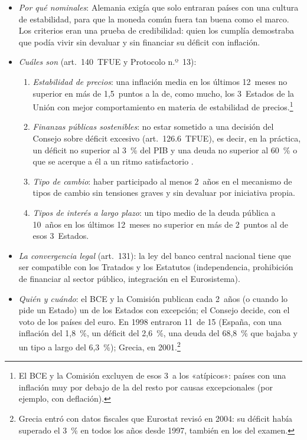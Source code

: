 \documentclass[11pt]{article}
\begin{document}
\begin{itemize}
\item \emph{Por qué nominales}: Alemania exigía que solo entraran países con una cultura de estabilidad, para que la moneda común fuera tan buena como el marco. Los criterios eran una prueba de credibilidad: quien los cumplía demostraba que podía vivir sin devaluar y sin financiar su déficit con inflación.
\item \emph{Cuáles son} (art.~140~TFUE y Protocolo n.º~13)\nocite{TFUE2016,UE2016Protocolo13}:
  \begin{enumerate}
  \item \emph{Estabilidad de precios}: una inflación media en los últimos 12~meses no superior en más de 1,5~puntos a la de, como mucho, los 3~Estados de la Unión con mejor comportamiento en materia de estabilidad de precios.\footnote{El BCE y la Comisión excluyen de esos 3~a los «atípicos»: países con una inflación muy por debajo de la del resto por causas excepcionales (por ejemplo, con deflación).}
  \item \emph{Finanzas públicas sostenibles}: no estar sometido a una decisión del Consejo sobre déficit excesivo (art.~126.6~TFUE), es decir, en la práctica, un déficit no superior al 3~\% del PIB y una deuda no superior al 60~\% o que se acerque a él a un ritmo satisfactorio .
  \item \emph{Tipo de cambio}: haber participado al menos 2~años en el mecanismo de tipos de cambio sin tensiones graves y sin devaluar por iniciativa propia.
  \item \emph{Tipos de interés a largo plazo}: un tipo medio de la deuda pública a 10~años en los últimos 12~meses no superior en más de 2~puntos al de esos 3~Estados.
  \end{enumerate}
\item \emph{La convergencia legal} (art.~131): la ley del banco central nacional tiene que ser compatible con los Tratados y los Estatutos (independencia, prohibición de financiar al sector público, integración en el Eurosistema).
\item \emph{Quién y cuándo}: el BCE y la Comisión publican cada 2~años (o cuando lo pide un Estado) un  de los Estados con excepción; el Consejo decide, con el voto de los países del euro. En 1998 entraron 11~de 15 (España, con una inflación del 1,8~\%, un déficit del 2,6~\%, una deuda del 68,8~\% que bajaba y un tipo a largo del 6,3~\%)\nocite{IME1998Convergencia}; Grecia, en 2001.\footnote{Grecia entró con datos fiscales que Eurostat revisó en 2004: su déficit había superado el 3~\% en todos los años desde 1997, también en los del examen.}

\end{itemize}
\end{document}
